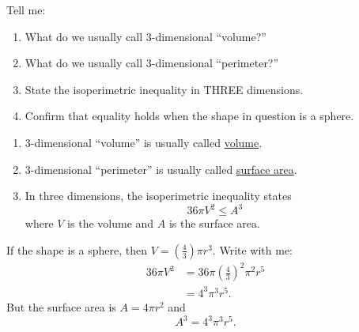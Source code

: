 \documentclass[nooutcomes,noauthor,handout]{ximera}
\begin{document}
\begin{question}
  Tell me:
  \begin{enumerate}
  \item What do we usually call $3$-dimensional ``volume?''
  \item What do we usually call $3$-dimensional ``perimeter?''
  \item State the isoperimetric inequality in THREE dimensions.
  \item Confirm that equality holds when the shape in question is a
    sphere.
  \end{enumerate}
  \begin{freeResponse}
    \begin{enumerate}
    \item $3$-dimensional ``volume'' is usually called \underline{volume}.
    \item $3$-dimensional ``perimeter'' is usually called
      \underline{surface area}.
    \item In three dimensions, the isoperimetric inequality states
      \[
      36 \pi V^2 \le A^3
      \]
      where $V$ is the volume and $A$ is the surface area.
    \end{enumerate}
  \item If the shape is a sphere, then $V= \left(\frac{4}{3}\right)\pi
    r^3$. Write with me:
    \begin{align*}
      36 \pi V^2 &= 36 \pi \left(\frac{4}{3}\right)^2\pi^2
      r^5\\
      &= 4^3 \pi^3 r^5.
    \end{align*}
    But the surface area is $A = 4\pi r^2$ and
    \[
    A^3 = 4^3 \pi^3 r^5.
    \]
  \end{freeResponse}
\end{question}
\mynewpage
\end{document}

